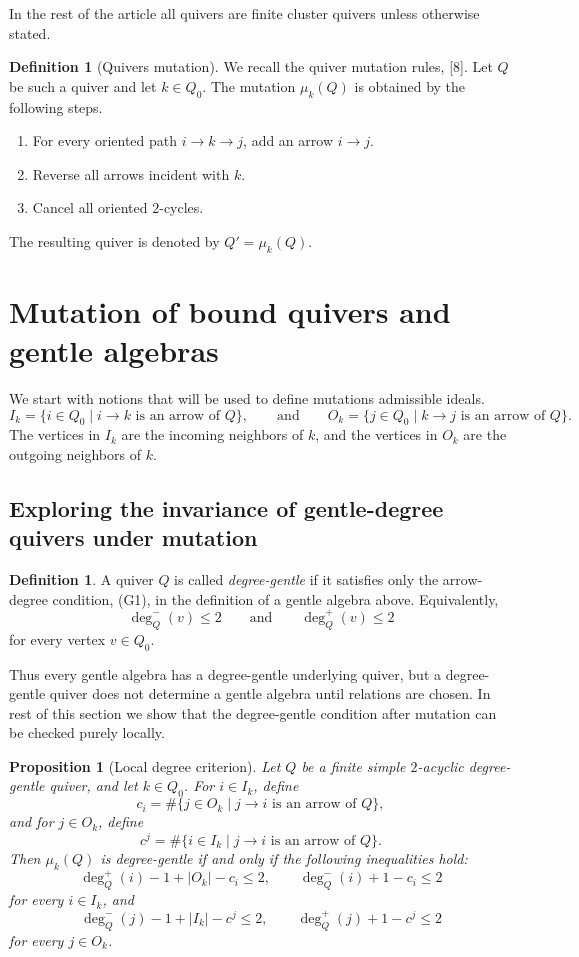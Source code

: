 \documentclass[11pt]{article}
\theoremstyle{plain}
\newtheorem{proposition}[theorem]{Proposition}
\theoremstyle{definition}
\newtheorem{definition}[theorem]{Definition}
\theoremstyle{remark}
\begin{document}
In the rest of the article all quivers are finite cluster quivers unless otherwise stated. 

\begin{definition}[Quivers mutation]
We recall the quiver mutation rules, [8].  Let \(Q\) be such a quiver and let \(k\in Q_0\).  The mutation
\(\mu_k(Q)\) is obtained by the following steps.
\begin{enumerate}[leftmargin=2em]
  \item For every oriented path \(i\to k\to j\), add an arrow \(i\to j\).
  \item Reverse all arrows incident with \(k\).
  \item Cancel all oriented \(2\)-cycles.
\end{enumerate}
The resulting quiver is denoted by \(Q'=\mu_k(Q)\). 
\end{definition}
\section{Mutation of bound quivers and gentle algebras}

We start with notions that will be used  to define mutations admissible ideals. 
\[
  I_k=\{i\in Q_0\mid i\to k\text{ is an arrow of }Q\},
  \qquad  \text{and} \qquad 
  O_k=\{j\in Q_0\mid k\to j\text{ is an arrow of }Q\}.
\]
The vertices in \(I_k\) are the incoming neighbors of \(k\), and the vertices in
\(O_k\) are the outgoing neighbors of \(k\).

\subsection{Exploring the invariance of gentle-degree quivers under mutation}


\begin{definition}
A quiver \(Q\) is called \emph{degree-gentle} if it satisfies only the arrow-degree condition, (G1),  in the definition of a gentle algebra above.  Equivalently,
\[
  \deg_Q^-(v)\leq 2
  \qquad\text{and}\qquad
  \deg_Q^+(v)\leq 2
\]
for every vertex \(v\in Q_0\).
\end{definition}

Thus every gentle algebra has a degree-gentle underlying quiver, but a
degree-gentle quiver does not determine a gentle algebra until relations are
chosen. In rest of this section we show that the degree-gentle condition after mutation can be
checked purely locally.

\begin{proposition}[Local degree criterion]\label{prop:degree-criterion}
Let \(Q\) be a finite simple \(2\)-acyclic degree-gentle quiver, and let
\(k\in Q_0\).  For \(i\in I_k\), define
\[
  c_i=\#\{j\in O_k\mid j\to i\text{ is an arrow of }Q\},
\]
and for \(j\in O_k\), define
\[
  c^j=\#\{i\in I_k\mid j\to i\text{ is an arrow of }Q\}.
\]
Then \(\mu_k(Q)\) is degree-gentle if and only if the following inequalities
hold:
\[
  \deg_Q^+(i)-1+|O_k|-c_i\leq 2,
  \qquad
  \deg_Q^-(i)+1-c_i\leq 2
\]
for every \(i\in I_k\), and
\[
  \deg_Q^-(j)-1+|I_k|-c^j\leq 2,
  \qquad
  \deg_Q^+(j)+1-c^j\leq 2
\]
for every \(j\in O_k\).
\end{proposition}
\end{document}
